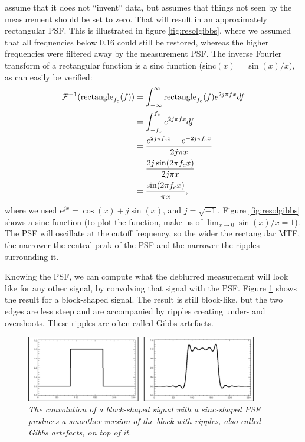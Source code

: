 \documentclass[11pt,oneside]{book}
\begin{document}
assume that it does not ``invent'' data, but assumes that things not
seen by the measurement should be set to zero. That will result in an
approximately rectangular PSF. This is illustrated in figure
\ref{fig:resolgibbs}, where we assumed that all frequencies below 0.16
could still be restored, whereas the higher frequencies were filtered
away by the measurement PSF. The inverse Fourier transform of a
rectangular function is a sinc function ($\mbox{sinc}(x) =
\sin(x)/x$), as can easily be verified:
\begin{align}
  {\cal F}^{-1}(\mbox{rectangle}_{f_c}(f))
  &= \int_{-\infty}^{\infty} \mbox{rectangle}_{f_c}(f) e^{2j\pi f x}
  df \nonumber\\
  &= \int_{-f_x}^{f_c} e^{2j\pi f x} df \nonumber\\
  &= \frac{e^{2j\pi f_c x} - e^{- 2j\pi f_c x}}{2j\pi x} \nonumber\\
  &= \frac{2j \sin(2\pi f_c x)}{2j\pi x} \nonumber\\
  &= \frac{\sin(2\pi f_c x)}{ \pi x},
\end{align}
where we used $e^{jx} = \cos(x) + j \sin(x)$, and $j =
\sqrt{-1}$. Figure \ref{fig:resolgibbs} shows a sinc function (to plot
the function, make us of $\lim_{x \rightarrow 0} \sin(x)/x = 1$). The PSF
will oscillate at the cutoff frequency, so the wider the rectangular
MTF, the narrower the central peak of the PSF and the narrower the
ripples surrounding it.

Knowing the PSF, we can compute what the deblurred measurement will
look like for any other signal, by convolving that signal with the
PSF. Figure \ref{fig:resolsinc} shows the result for a block-shaped
signal. The result is still block-like, but the two edges are less
steep and are accompanied by ripples creating under- and
overshoots. These ripples are often called Gibbs artefacts.

\begin{figure}[htb]
\centering
\includegraphics[width=0.9\textwidth]{figs/fig_resol_sinc.pdf}
\caption{\label{fig:resolsinc} \emph{The convolution of a block-shaped
    signal with a sinc-shaped PSF produces a smoother version of the
    block with ripples, also called Gibbs artefacts, on top of it.}}
\end{figure}
\end{document}
